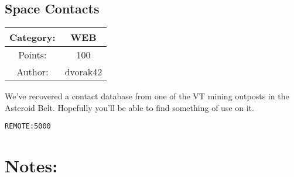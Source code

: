 \begin{center}
\section*{Space Contacts}
{\large
\begin{tabular}{| c c |}
\hline
Category: & WEB\\\hline
Points: & 100\\\hline
Author: & dvorak42\\\hline
\end{tabular}
}
\end{center}
\vspace{0.5in}

{\large
We've recovered a contact database from one of the VT mining outposts in the Asteroid Belt. Hopefully you'll be able to find something of use on it.
}
\vspace{0.25in}
\begin{center}
  {\Large\tt REMOTE:5000}
\end{center}

\vspace{0.25in}
\section*{Notes:}
